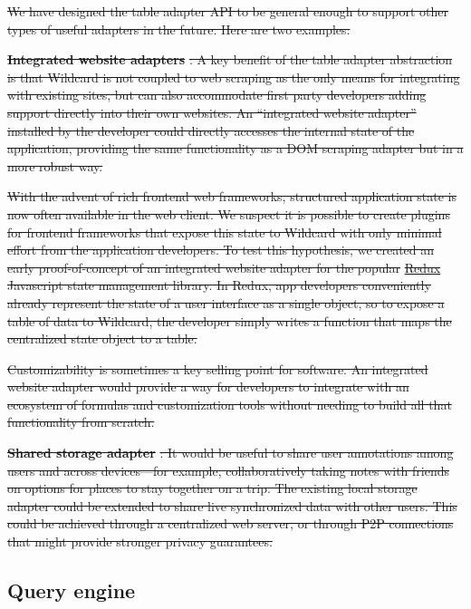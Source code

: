 \documentclass[sigplan,screen,10pt,anonymous,review]{acmart}
\providecommand{\DIFdel}[1]{{\protect\color{red}\sout{#1}}}                      %
\providecommand{\DIFdelend}{} %
\begin{document}
\DIFdel{We have designed the table adapter API to be general enough to support
other types of useful adapters in the future. Here are two examples:
}%

\textbf{\DIFdel{Integrated website adapters}}%
\DIFdel{: A key benefit of the table adapter
abstraction is that Wildcard is not coupled to web scraping as the only
means for integrating with existing sites, but can also accommodate
first party developers adding support directly into their own websites.
An ``integrated website adapter'' installed by the developer could
directly accesses the internal state of the application, providing the
same functionality as a DOM scraping adapter but in a more robust way.
}%

\DIFdel{With the advent of rich frontend web frameworks, structured application
state is now often available in the web client. We suspect it is
possible to create plugins for frontend frameworks that expose this
state to Wildcard with only minimal effort from the application
developers. To test this hypothesis, we created an early
proof-of-concept of an integrated website adapter for the popular
}\href{https://redux.js.org/}{\DIFdel{Redux}} %
\DIFdel{Javascript state management library.
In Redux, app developers conveniently already represent the state of a
user interface as a single object, so to expose a table of data to
Wildcard, the developer simply writes a function that maps the
centralized state object to a table.
}%

\DIFdel{Customizability is sometimes a key selling point for software. An
integrated website adapter would provide a way for developers to
integrate with an ecosystem of formulas and customization tools without
needing to build all that functionality from scratch.
}%

\textbf{\DIFdel{Shared storage adapter}}%
\DIFdel{: It would be useful to share user
annotations among users and across devices---for example,
collaboratively taking notes with friends on options for places to stay
together on a trip. The existing local storage adapter could be extended
to share live synchronized data with other users. This could be achieved
through a centralized web server, or through P2P connections that might
provide stronger privacy guarantees.
}%

\DIFdelend \hypertarget{query-engine}{%
\subsection{Query engine}\label{query-engine}}
\end{document}
